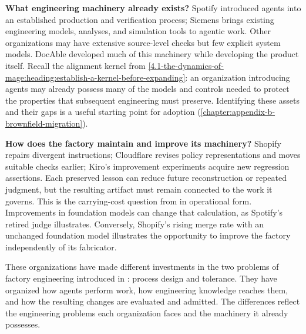 \textbf{What engineering machinery already exists?} Spotify introduced agents into an established production and verification process; Siemens brings existing engineering models, analyses, and simulation tools to agentic work. Other organizations may have extensive source-level checks but few explicit system models. DocAble developed much of this machinery while developing the product itself. Recall the alignment kernel from \autoref{4.1-the-dynamics-of-mage:heading:establish-a-kernel-before-expanding}: an organization introducing agents may already possess many of the models and controls needed to protect the properties that subsequent engineering must preserve. Identifying these assets and their gaps is a useful starting point for adoption (\autoref{chapter:appendix-b-brownfield-migration}).


\textbf{How does the factory maintain and improve its machinery?} Shopify repairs divergent instructions; Cloudflare revises policy representations and moves suitable checks earlier; Kiro's improvement experiments acquire new regression assertions. Each preserved lesson can reduce future reconstruction or repeated judgment, but the resulting artifact must remain connected to the work it governs. This is the carrying-cost question from  in operational form. Improvements in foundation models can change that calculation, as Spotify's retired judge illustrates. Conversely, Shopify's rising merge rate with an unchanged foundation model illustrates the opportunity to improve the factory independently of its fabricator.

These organizations have made different investments in the two problems of factory engineering introduced in : process design and tolerance. They have organized how agents perform work, how engineering knowledge reaches them, and how the resulting changes are evaluated and admitted. The differences reflect the engineering problems each organization faces and the machinery it already possesses.
